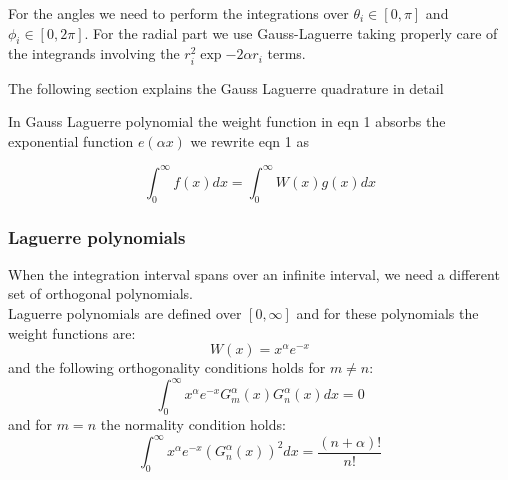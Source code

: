 \documentclass[9pt,a4paper,titlepage]{article}
\begin{document}
For the angles we need to perform the integrations over $\theta _i∈[0,\pi] $ and $\phi_i∈[0,2\pi]$. For the radial part we use
Gauss-Laguerre taking properly care of the integrands involving the  $r_i^2\exp{−2\alpha r_i}$ terms.


The following section explains the Gauss Laguerre quadrature in detail

In Gauss Laguerre polynomial the weight function in eqn 1 absorbs the exponential function $e(\alpha x)$
we rewrite eqn 1 as

\begin{equation}
\int_{0}^{\infty} f(x)dx=\int_{0}^{\infty} W(x)g(x)dx
\end{equation}


\subsubsection{Laguerre polynomials} When the integration interval spans over an infinite interval, we need a different set of orthogonal polynomials. 
\\Laguerre polynomials are defined over $[0,\infty]$ and for these polynomials the weight functions are:
\begin{equation} 
W(x)= x^\alpha e^{-x}
\end{equation}
and the following orthogonality conditions holds for $m\neq n$:
\begin{equation}
\int_{0}^{\infty} x^\alpha e^{-x} G_{m}^\alpha(x)G_{n}^\alpha(x)dx=0
\end{equation}
and for $m=n$ the normality condition holds:
\begin{equation}
\int_{0}^{\infty} x^\alpha e^{-x} (G_{n}^\alpha(x))^2 dx=\frac{(n+\alpha)!}{n!}
\end{equation}
\end{document}
